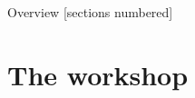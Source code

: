 \documentclass[10pt]{beamer}
\begin{document}
 
{
\frame{\titlepage}
}
\setcounter{tocdepth}{1}
\begin{frame}{Overview}%
  [sections numbered]
  \begin{small}
  \begin{multicols}{2}\tableofcontents\end{multicols}
  \end{small}
\end{frame}

 
\section{The workshop}
\end{document}
